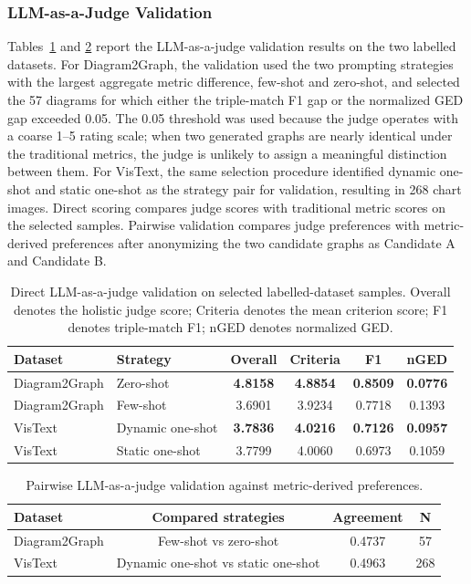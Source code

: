 \documentclass[preprint,12pt]{elsarticle}
\begin{document}
\subsubsection{LLM-as-a-Judge Validation}

Tables~\ref{tab:judge_direct_validation} and \ref{tab:judge_pairwise_validation} report the LLM-as-a-judge validation results on the two labelled datasets. For Diagram2Graph, the validation used the two prompting strategies with the largest aggregate metric difference, few-shot and zero-shot, and selected the 57 diagrams for which either the triple-match F1 gap or the normalized GED gap exceeded 0.05. The 0.05 threshold was used because the judge operates with a coarse 1--5 rating scale; when two generated graphs are nearly identical under the traditional metrics, the judge is unlikely to assign a meaningful distinction between them. For VisText, the same selection procedure identified dynamic one-shot and static one-shot as the strategy pair for validation, resulting in 268 chart images. Direct scoring compares judge scores with traditional metric scores on the selected samples. Pairwise validation compares judge preferences with metric-derived preferences after anonymizing the two candidate graphs as Candidate A and Candidate B.

\begin{table}[ht]
\centering
\small
\begin{tabular}{llcccc}
\toprule
\textbf{Dataset} & \textbf{Strategy} & \textbf{Overall} & \textbf{Criteria} & \textbf{F1} & \textbf{nGED} \\
\midrule
Diagram2Graph & Zero-shot & \textbf{4.8158} & \textbf{4.8854} & \textbf{0.8509} & \textbf{0.0776} \\
Diagram2Graph & Few-shot & 3.6901 & 3.9234 & 0.7718 & 0.1393 \\
\addlinespace
VisText & Dynamic one-shot & \textbf{3.7836} & \textbf{4.0216} & \textbf{0.7126} & \textbf{0.0957} \\
VisText & Static one-shot & 3.7799 & 4.0060 & 0.6973 & 0.1059 \\
\bottomrule
\end{tabular}
\caption{Direct LLM-as-a-judge validation on selected labelled-dataset samples. Overall denotes the holistic judge score; Criteria denotes the mean criterion score; F1 denotes triple-match F1; nGED denotes normalized GED.}
\label{tab:judge_direct_validation}
\end{table}

\begin{table}[ht]
\centering
\small
\begin{tabular}{lccc}
\toprule
\textbf{Dataset} & \textbf{Compared strategies} & \textbf{Agreement} & \textbf{N} \\
\midrule
Diagram2Graph & Few-shot vs zero-shot & 0.4737 & 57 \\
VisText & Dynamic one-shot vs static one-shot & 0.4963 & 268 \\
\bottomrule
\end{tabular}
\caption{Pairwise LLM-as-a-judge validation against metric-derived preferences.}
\label{tab:judge_pairwise_validation}
\end{table}
\end{document}
